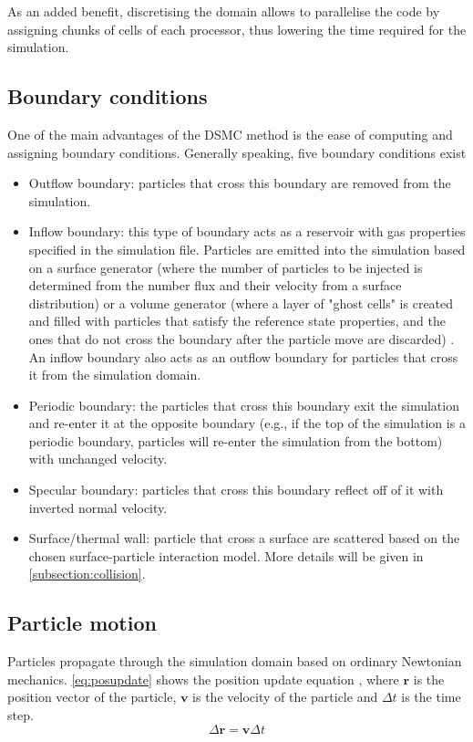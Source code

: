 As an added benefit, discretising the domain allows to parallelise the code by assigning chunks of cells of each processor, thus lowering the time required for the simulation.

\subsection{Boundary conditions}
One of the main advantages of the DSMC method is the ease of computing and assigning boundary conditions. Generally speaking, five boundary conditions exist \cite{natodsmc, spartadoc}
\begin{itemize}
    \item Outflow boundary: particles that cross this boundary are removed from the simulation.
    \item Inflow boundary: this type of boundary acts as a reservoir with gas properties specified in the simulation file. Particles are emitted into the simulation based on a surface generator (where the number of particles to be injected is determined from the number flux and their velocity from a surface distribution) or a volume generator (where a layer of "ghost cells" is created and filled with particles that satisfy the reference state properties, and the ones that do not cross the boundary after the particle move are discarded) \cite{natodsmc}. An inflow boundary also acts as an outflow boundary for particles that cross it from the simulation domain.
    \item Periodic boundary: the particles that cross this boundary exit the simulation and re-enter it at the opposite boundary (e.g., if the top of the simulation is a periodic boundary, particles will re-enter the simulation from the bottom) with unchanged velocity.
    \item Specular boundary: particles that cross this boundary reflect off of it with inverted normal velocity.
    \item Surface/thermal wall: particle that cross a surface are scattered based on the chosen surface-particle interaction model. More details will be given in \autoref{subsection:collision}.
\end{itemize}

\subsection{Particle motion}
Particles propagate through the simulation domain based on ordinary Newtonian mechanics. \autoref{eq:posupdate} shows the position update equation \cite{bird}, where $\mathbf{r}$ is the position vector of the particle, $\mathbf{v}$ is the velocity of the particle and $\Delta{t}$ is the time step.
\begin{equation}
    \Delta{\mathbf{r}} = \mathbf{v} \Delta{t}
    \label{eq:posupdate}
\end{equation}

